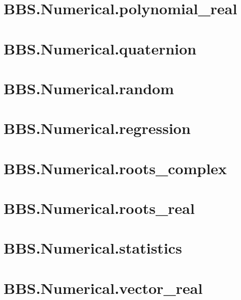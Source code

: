 \documentclass[10pt, openany]{book}
\begin{document}
\section{BBS.Numerical.polynomial\_real}
\section{BBS.Numerical.quaternion}
\section{BBS.Numerical.random}
\section{BBS.Numerical.regression}
\section{BBS.Numerical.roots\_complex}
\section{BBS.Numerical.roots\_real}
\section{BBS.Numerical.statistics}
\section{BBS.Numerical.vector\_real}
\end{document}
